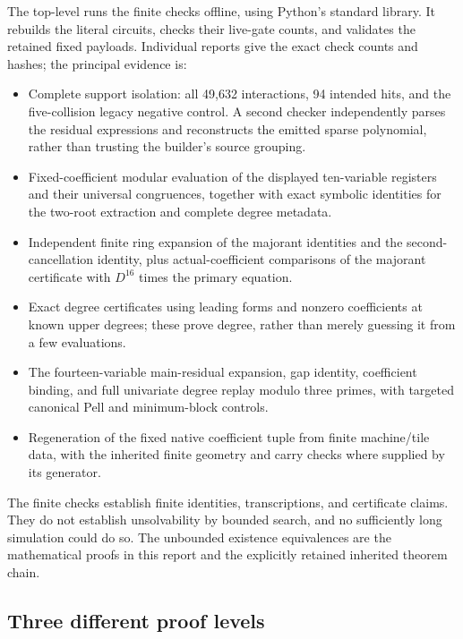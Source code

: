 \documentclass[11pt,a4paper]{article}
\theoremstyle{definition}\newtheorem{definition}[theorem]{Definition}
\theoremstyle{remark}\newtheorem{remark}[theorem]{Remark}
\newcommand{\code}[1]{\texttt{\small\detokenize{#1}}}
\begin{document}
The top-level \code{verify.py} runs the finite checks offline, using Python's
standard library. It rebuilds the literal circuits, checks their live-gate
counts, and validates the retained fixed payloads. Individual reports give
the exact check counts and hashes; the principal evidence is:
\begin{itemize}
\item Complete support isolation: all 49,632 interactions, 94 intended hits,
  and the five-collision legacy negative control. A second checker
  independently parses the residual expressions and reconstructs the
  emitted sparse polynomial, rather than trusting the builder's source
  grouping.
\item Fixed-coefficient modular evaluation of the displayed ten-variable
  registers and their universal congruences, together with exact symbolic
  identities for the two-root extraction and complete degree metadata.
\item Independent finite ring expansion of the majorant identities and
  the second-cancellation identity, plus actual-coefficient comparisons
  of the majorant certificate with $D^{16}$ times the primary equation.
\item Exact degree certificates using leading forms and nonzero
  coefficients at known upper degrees; these prove degree, rather than
  merely guessing it from a few evaluations.
\item The fourteen-variable main-residual expansion, gap identity,
  coefficient binding, and full univariate degree replay modulo three
  primes, with targeted canonical Pell and minimum-block controls.
\item Regeneration of the fixed native coefficient tuple from finite
  machine/tile data, with the inherited finite geometry and carry checks
  where supplied by its generator.
\end{itemize}

The finite checks establish finite identities, transcriptions, and
certificate claims. They do not establish unsolvability by bounded
search, and no sufficiently long simulation could do so. The unbounded
existence equivalences are the mathematical proofs in this report and the
explicitly retained inherited theorem chain.

\subsection{Three different proof levels}
\end{document}
